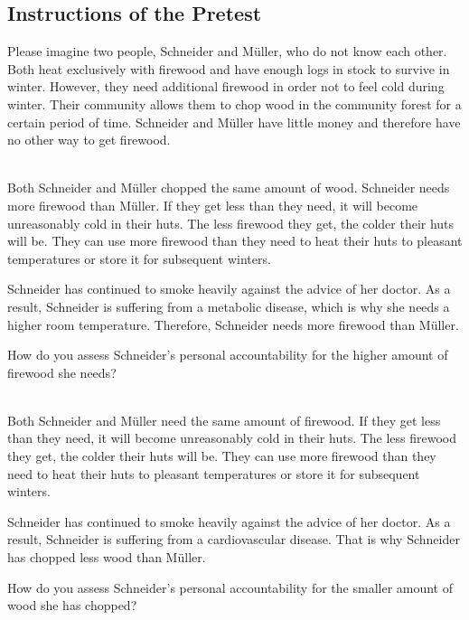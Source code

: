 \documentclass[smallcondensed]{svjour3}
\begin{document}
\subsection*{Instructions of the Pretest}
%
\noindent Please imagine two people, Schneider and M\"uller, who do not know each other. Both heat exclusively with firewood and have enough logs in stock to survive in winter. However, they need additional firewood in order not to feel cold during winter. Their community allows them to chop wood in the community forest for a certain period of time. Schneider and M\"uller have little money and therefore have no other way to get firewood.\par
%
\vspace{1ex}
\\
Both Schneider and M\"uller chopped the same amount of wood. Schneider needs more firewood than M\"uller. If they get less than they need, it will become unreasonably cold in their huts. The less firewood they get, the colder their huts will be. They can use more firewood than they need to heat their huts to pleasant temperatures or store it for subsequent winters.\par
%
Schneider has continued to smoke heavily against the advice of her doctor. As a result, Schneider is suffering from a metabolic disease, which is why she needs a higher room temperature. Therefore, Schneider needs more firewood than M\"uller.\par
%
How do you assess Schneider's personal accountability for the higher amount of firewood she needs?\par
%
\vspace{1ex}
\\
Both Schneider and M\"uller need the same amount of firewood. If they get less than they need, it will become unreasonably cold in their huts. The less firewood they get, the colder their huts will be. They can use more firewood than they need to heat their huts to pleasant temperatures or store it for subsequent winters.\par
%
Schneider has continued to smoke heavily against the advice of her doctor. As a result, Schneider is suffering from a cardiovascular disease. That is why Schneider has chopped less wood than M\"uller.\par
%
How do you assess Schneider's personal accountability for the smaller amount of wood she has chopped?\par
\end{document}
